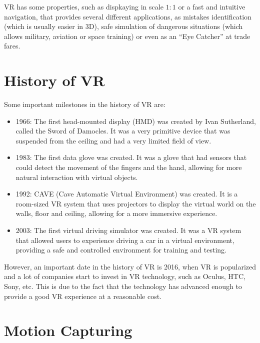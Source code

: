 VR has some properties, such as dispkaying in scale $1:1$ or a fast and intuitive navigation, that provides several different applications, as mistakes identification (which is usually easier in 3D), safe simulation of dangerous situations (which allows military, aviation or space training) or even as an ``Eye Catcher'' at trade fares.

\section{History of VR}

Some important milestones in the history of VR are:
\begin{itemize}
   \item 1966: The first head-mounted display (HMD) was created by Ivan Sutherland, called the Sword of Damocles. It was a very primitive device that was suspended from the ceiling and had a very limited field of view.
   \item 1983: The first data glove was created. It was a glove that had sensors that could detect the movement of the fingers and the hand, allowing for more natural interaction with virtual objects. 
   \item 1992: CAVE (Cave Automatic Virtual Environment) was created. It is a room-sized VR system that uses projectors to display the virtual world on the walls, floor and ceiling, allowing for a more immersive experience.
   \item 2003: The first virtual driving simulator was created. It was a VR system that allowed users to experience driving a car in a virtual environment, providing a safe and controlled environment for training and testing.
\end{itemize}

However, an important date in the history of VR is 2016, when VR is popularized and a lot of companies start to invest in VR technology, such as Oculus, HTC, Sony, etc. This is due to the fact that the technology has advanced enough to provide a good VR experience at a reasonable cost.

\section{Motion Capturing}

